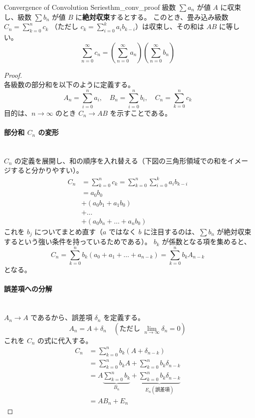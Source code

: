 \documentclass[dvipdfmx,a4paper,11pt]{jsarticle}
\begin{document}
\begin{reidai}{Convergence of Convolution Series}{thm_conv_proof}
    級数 $\sum a_n$ が値 $A$ に収束し、級数 $\sum b_n$ が値 $B$ に\textbf{絶対収束}するとする。
    このとき、畳み込み級数 $C_n = \sum_{k=0}^n c_k$ （ただし $c_k = \sum_{i=0}^k a_i b_{k-i}$）は収束し、その和は $AB$ に等しい。
    \[
    \sum_{n=0}^{\infty} c_n = \left(\sum_{n=0}^{\infty} a_n\right) \left(\sum_{n=0}^{\infty} b_n\right)
    \]
\end{reidai}
\vspace{0.5em}
\begin{proof}\ \\
\noindent
各級数の部分和を以下のように定義する。
\[
A_n = \sum_{i=0}^{n} a_i, \quad B_n = \sum_{i=0}^{n} b_i, \quad C_n = \sum_{k=0}^{n} c_k
\]
目的は、$n \to \infty$ のとき $C_n \to AB$ を示すことである。

\paragraph{部分和 $C_n$ の変形}\ \\
\noindent
$C_n$ の定義を展開し、和の順序を入れ替える（下図の三角形領域での和をイメージすると分かりやすい）。
\begin{align*}
    C_n &= \sum_{k=0}^{n} c_k = \sum_{k=0}^{n} \sum_{i=0}^{k} a_i b_{k-i} \\
    &= a_0 b_0 \\
    &+ (a_0 b_1 + a_1 b_0) \\
    &+ \dots \\
    &+ (a_0 b_n + \dots + a_n b_0)
\end{align*}
これを $b_j$ についてまとめ直す（$a$ ではなく $b$ に注目するのは、$\sum b_n$ が絶対収束するという強い条件を持っているためである）。
$b_k$ が係数となる項を集めると、
\[
C_n = \sum_{k=0}^{n} b_k (a_0 + a_1 + \dots + a_{n-k}) = \sum_{k=0}^{n} b_k A_{n-k}
\]
となる。

\paragraph{誤差項への分解}\ \\
\noindent
$A_n \to A$ であるから、誤差項 $\delta_n$ を定義する。
\[
A_n = A + \delta_n \quad (\text{ただし } \lim_{n \to \infty} \delta_n = 0)
\]
これを $C_n$ の式に代入する。
\begin{align*}
    C_n &= \sum_{k=0}^{n} b_k (A + \delta_{n-k}) \\
    &= \sum_{k=0}^{n} b_k A + \sum_{k=0}^{n} b_k \delta_{n-k} \\
    &= A \underbrace{\sum_{k=0}^{n} b_k}_{B_n} + \underbrace{\sum_{k=0}^{n} b_k \delta_{n-k}}_{E_n (\text{誤差項})} \\
    &= A B_n + E_n
\end{align*}


\end{proof}
\end{document}
